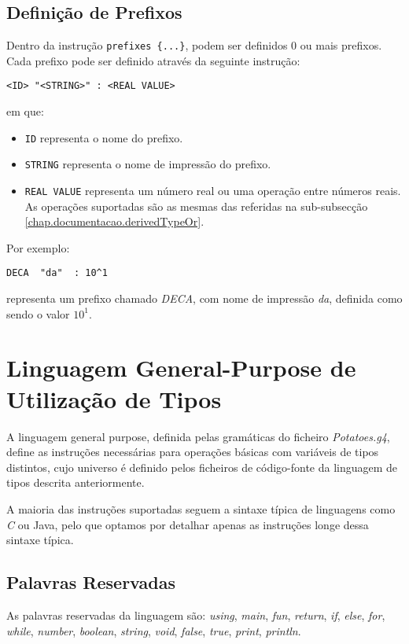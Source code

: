 \documentclass{report}
\begin{document}
\subsection{Definição de Prefixos} 
Dentro da instrução \texttt{prefixes \{...\}}, podem ser definidos 0 ou mais prefixos. Cada prefixo pode ser definido através da seguinte instrução:
\begin{lstlisting}[caption= Linguagem de Definição de Tipos - Instrução de definição de prefixo]
<ID> "<STRING>" : <REAL VALUE>
\end{lstlisting}
em que:
\begin{itemize}
    \item \texttt{ID} representa o nome do prefixo.
    \item \texttt{STRING} representa o nome de impressão do prefixo.
    \item \texttt{REAL VALUE} representa um número real ou uma operação entre números reais. As operações suportadas são as mesmas das referidas na sub-subsecção \ref{chap.documentacao.derivedTypeOr}.
\end{itemize}
\noindent
Por exemplo:
\begin{lstlisting}
DECA  "da"  : 10^1 
\end{lstlisting}
representa um prefixo chamado \textit{DECA}, com nome de impressão \textit{da}, definida como sendo o valor $10^1$.
\pagebreak
\section{Linguagem General-Purpose de Utilização de Tipos}
\label{chap.documentacao.sec.potatoes}
A linguagem general purpose, definida pelas gramáticas do ficheiro \textit{Potatoes.g4}, define as instruções necessárias para operações básicas com variáveis de tipos distintos, cujo universo é definido pelos ficheiros de código-fonte da linguagem de tipos descrita anteriormente.

A maioria das instruções suportadas seguem a sintaxe típica de linguagens como \textit{C} ou Java, pelo que optamos por detalhar apenas as instruções longe dessa sintaxe típica. 

\subsection{Palavras Reservadas}
As palavras reservadas da linguagem são: \textit{using}, \textit{main}, \textit{fun}, \textit{return}, \textit{if}, \textit{else}, \textit{for}, \textit{while}, \textit{number}, \textit{boolean}, \textit{string}, \textit{void}, \textit{false}, \textit{true}, \textit{print}, \textit{println}.
\end{document}

